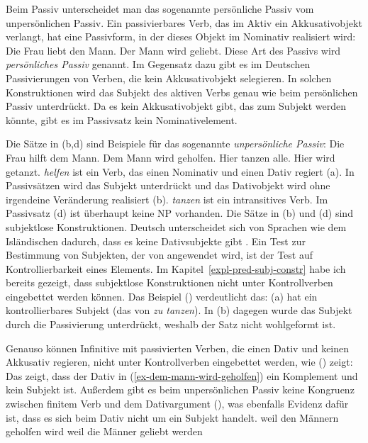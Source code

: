 \noindent
Beim Passiv unterscheidet man das sogenannte persönliche Passiv vom unpersönlichen Passiv.
Ein passivierbares Verb, das im Aktiv ein Akkusativobjekt verlangt, hat eine Passivform,
in der dieses Objekt im Nominativ realisiert wird:
\eal
\label{ex-agentive-passive}
\ex Die Frau liebt den Mann.
\ex Der Mann wird geliebt.
\zl
Diese Art des Passivs wird \emph{persönliches Passiv} genannt.
Im Gegensatz dazu gibt es im Deutschen Passivierungen von Verben, die kein
Akkusativobjekt selegieren. In solchen Konstruktionen wird das Subjekt
des aktiven Verbs genau wie beim persönlichen Passiv unterdrückt.
Da es kein Akkusativobjekt gibt, das zum Subjekt
werden könnte, gibt es im Passivsatz kein Nominativelement.

Die Sätze in (b,d) sind Beispiele für das sogenannte \emph{unpersönliche Passiv}:
\eal
\label{ex-agentive-passive-dat}
\ex Die Frau hilft dem Mann.
\ex\label{ex-dem-mann-wird-geholfen} 
Dem Mann wird geholfen.
\ex Hier tanzen alle.
\ex\label{ex-hier-wird-getanzt}
Hier wird getanzt.
\zl
\emph{helfen} ist ein Verb, das einen Nominativ und einen Dativ regiert (a).
In Passivsätzen wird das Subjekt unterdrückt und das Dativobjekt wird ohne
irgendeine Veränderung realisiert (b). \emph{tanzen} ist ein intransitives Verb.
Im Passivsatz (d) ist überhaupt keine NP vorhanden. Die Sätze in (b) und (d)
sind subjektlose Konstruktionen. 
Deutsch unterscheidet sich von Sprachen wie dem Isländischen
dadurch, dass es keine Dativsubjekte\label{page-dativsubjekte}
gibt \citep*{ZMT85a}.
Ein Test zur Bestimmung von Subjekten, der von \citet*[]{ZMT85a} angewendet wird,
ist der Test auf Kontrollierbarkeit eines Elements. Im Kapitel~\ref{expl-pred-subj-constr} habe ich bereits
gezeigt, dass subjektlose Konstruktionen nicht unter Kontrollverben eingebettet werden können.
Das Beispiel () verdeutlicht das:
\eal
{}
\zl
(a) hat ein kontrollierbares Subjekt (das von \emph{zu tanzen}). In (b) dagegen wurde das
Subjekt durch die Passivierung unterdrückt, weshalb der Satz nicht wohlgeformt ist.

Genauso können Infinitive mit passivierten Verben, die einen Dativ und keinen Akkusativ regieren,
nicht unter Kontrollverben eingebettet werden, wie () zeigt:
\z
Das zeigt, dass der Dativ in (\ref{ex-dem-mann-wird-geholfen}) ein Komplement und kein Subjekt ist.
Außerdem gibt es beim unpersönlichen Passiv keine Kongruenz zwischen finitem Verb und dem Dativargument
(), was ebenfalls Evidenz dafür ist, dass es sich beim Dativ nicht um ein Subjekt
handelt.
\eal
\ex weil den Männern geholfen wird
\ex weil die Männer geliebt werden
\zl


